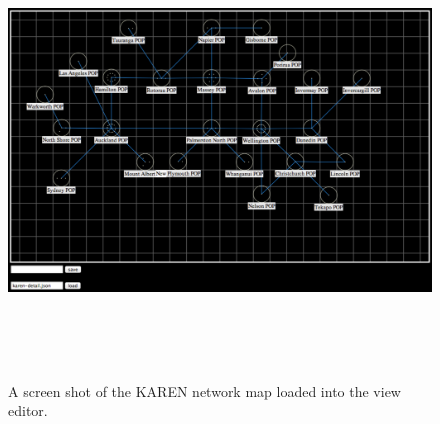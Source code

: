 \documentclass[11pt, a4paper]{article}
\begin{document}
\begin{figure}
\centering
\includegraphics[width=170mm,height=120.16mm]{assets/editor1-0.pdf}
\caption{A screen shot of the KAREN network map loaded into the view editor.}
\label{fig:editor1.0}
\end{figure}



\newpage

\end{document}
